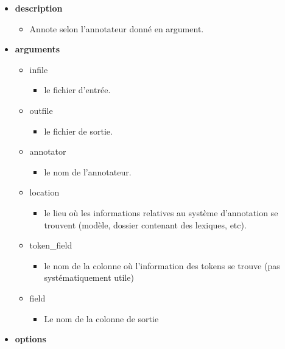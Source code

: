 \documentclass[manual-fr.tex]{subfiles}
\begin{document}
\begin{itemize}
    \item[] \textbf{description}
        \begin{itemize}
            \item[] Annote selon l'annotateur donné en argument.
        \end{itemize}
    \item[] \textbf{arguments}
        \begin{itemize}
            \item[] infile
                \begin{itemize}
                    \item[] le fichier d'entrée.
                \end{itemize}
            \item[] outfile
                \begin{itemize}
                    \item[] le fichier de sortie.
                \end{itemize}
            \item[] annotator
                \begin{itemize}
                    \item[] le nom de l'annotateur.
                \end{itemize}
            \item[] location
                \begin{itemize}
                    \item[] le lieu où les informations relatives au système d'annotation se trouvent (modèle, dossier contenant des lexiques, etc).
                \end{itemize}
            \item[] token\_field
                \begin{itemize}
                    \item[] le nom de la colonne où l'information des tokens se trouve (pas systématiquement utile)
                \end{itemize}
            \item[] field
                \begin{itemize}
                    \item[] Le nom de la colonne de sortie
                \end{itemize}
        \end{itemize}
    \item[] \textbf{options}

\end{itemize}
\end{document}
